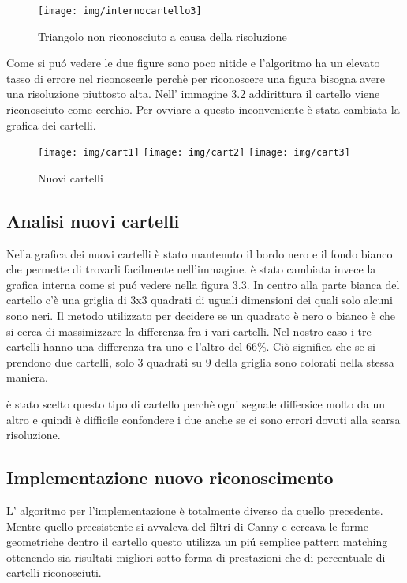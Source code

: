 		\begin{figure}[!ht]
			\centering
			\texttt{[image: img/internocartello3]}
			\caption[Triangolo con poca risoluzione]{Triangolo non riconosciuto a causa della risoluzione}
		\end{figure}

		Come si pu\'o vedere le due figure sono poco nitide e l'algoritmo ha un elevato tasso di errore nel riconoscerle perchè per riconoscere una figura bisogna avere una risoluzione piuttosto alta. Nell' immagine 3.2 addirittura il cartello viene riconosciuto come cerchio.
		Per ovviare a questo inconveniente è stata cambiata la grafica dei cartelli.
		\begin{figure}[!ht]
			\centering
			\texttt{[image: img/cart1]}
			\texttt{[image: img/cart2]}
			\texttt{[image: img/cart3]}
			\caption{Nuovi cartelli}
		\end{figure}

	\subsection{Analisi nuovi cartelli}
		Nella grafica dei nuovi cartelli è stato mantenuto il bordo nero e il fondo bianco che permette di trovarli facilmente nell'immagine. è stato cambiata invece la grafica interna come si pu\'o vedere nella figura 3.3. In centro alla parte bianca del cartello c'è una griglia di 3x3  quadrati di uguali dimensioni dei quali solo alcuni sono neri. Il metodo utilizzato per decidere se un quadrato è nero o bianco è che si cerca di massimizzare la differenza fra i vari cartelli. Nel nostro caso i tre cartelli hanno una differenza tra uno e l'altro del 66\%. Ciò significa che se si prendono due cartelli, solo 3 quadrati su 9 della griglia sono colorati nella stessa maniera.
		
		è stato scelto questo tipo di cartello perchè ogni segnale differsice molto da un altro e quindi è difficile confondere i due anche se ci sono errori dovuti alla scarsa risoluzione.

	\subsection{Implementazione nuovo riconoscimento}
		L' algoritmo per l'implementazione è totalmente diverso da quello precedente. Mentre quello preesistente si avvaleva del filtri di Canny e cercava le forme geometriche dentro il cartello questo utilizza un pi\'u semplice pattern matching ottenendo sia risultati migliori sotto forma di prestazioni che di percentuale di cartelli riconosciuti.\newline

